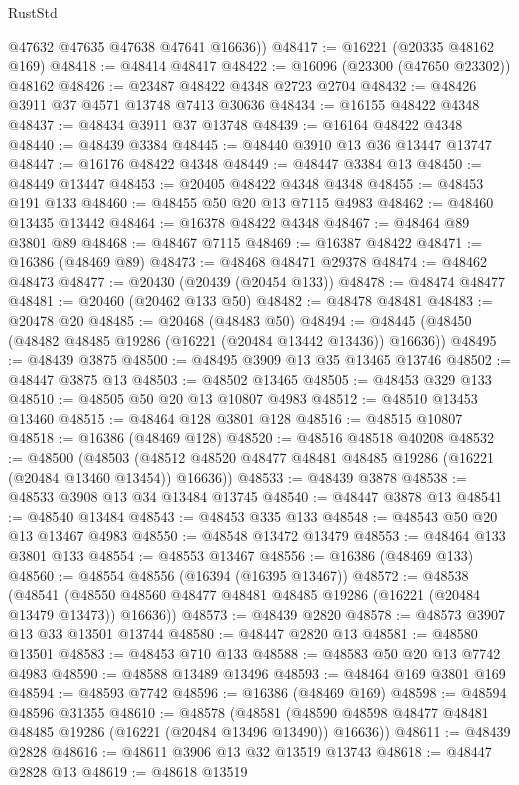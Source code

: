 \begin{lexlean}{RustStd}
\begin{coremodule}
        @47632
        @47635
        @47638
        @47641
        @16636))
@48417 := @16221 (@20335 @48162 @169)
@48418 := @48414 @48417
@48422 := @16096 (@23300 (@47650 @23302)) @48162
@48426 := @23487 @48422 @4348 @2723 @2704
@48432 := @48426 @3911 @37 @4571 @13748 @7413 @30636
@48434 := @16155 @48422 @4348
@48437 := @48434 @3911 @37 @13748
@48439 := @16164 @48422 @4348
@48440 := @48439 @3384
@48445 := @48440 @3910 @13 @36 @13447 @13747
@48447 := @16176 @48422 @4348
@48449 := @48447 @3384 @13
@48450 := @48449 @13447
@48453 := @20405 @48422 @4348 @4348
@48455 := @48453 @191 @133
@48460 := @48455 @50 @20 @13 @7115 @4983
@48462 := @48460 @13435 @13442
@48464 := @16378 @48422 @4348
@48467 := @48464 @89 @3801 @89
@48468 := @48467 @7115
@48469 := @16387 @48422
@48471 := @16386 (@48469 @89)
@48473 := @48468 @48471 @29378
@48474 := @48462 @48473
@48477 := @20430 (@20439 (@20454 @133))
@48478 := @48474 @48477
@48481 := @20460 (@20462 @133 @50)
@48482 := @48478 @48481
@48483 := @20478 @20
@48485 := @20468 (@48483 @50)
@48494 := @48445 (@48450 (@48482 @48485 @19286 (@16221 (@20484 @13442 @13436)) @16636))
@48495 := @48439 @3875
@48500 := @48495 @3909 @13 @35 @13465 @13746
@48502 := @48447 @3875 @13
@48503 := @48502 @13465
@48505 := @48453 @329 @133
@48510 := @48505 @50 @20 @13 @10807 @4983
@48512 := @48510 @13453 @13460
@48515 := @48464 @128 @3801 @128
@48516 := @48515 @10807
@48518 := @16386 (@48469 @128)
@48520 := @48516 @48518 @40208
@48532 := @48500
    (@48503 (@48512 @48520 @48477 @48481 @48485 @19286 (@16221 (@20484 @13460 @13454)) @16636))
@48533 := @48439 @3878
@48538 := @48533 @3908 @13 @34 @13484 @13745
@48540 := @48447 @3878 @13
@48541 := @48540 @13484
@48543 := @48453 @335 @133
@48548 := @48543 @50 @20 @13 @13467 @4983
@48550 := @48548 @13472 @13479
@48553 := @48464 @133 @3801 @133
@48554 := @48553 @13467
@48556 := @16386 (@48469 @133)
@48560 := @48554 @48556 (@16394 (@16395 @13467))
@48572 := @48538
    (@48541 (@48550 @48560 @48477 @48481 @48485 @19286 (@16221 (@20484 @13479 @13473)) @16636))
@48573 := @48439 @2820
@48578 := @48573 @3907 @13 @33 @13501 @13744
@48580 := @48447 @2820 @13
@48581 := @48580 @13501
@48583 := @48453 @710 @133
@48588 := @48583 @50 @20 @13 @7742 @4983
@48590 := @48588 @13489 @13496
@48593 := @48464 @169 @3801 @169
@48594 := @48593 @7742
@48596 := @16386 (@48469 @169)
@48598 := @48594 @48596 @31355
@48610 := @48578
    (@48581 (@48590 @48598 @48477 @48481 @48485 @19286 (@16221 (@20484 @13496 @13490)) @16636))
@48611 := @48439 @2828
@48616 := @48611 @3906 @13 @32 @13519 @13743
@48618 := @48447 @2828 @13
@48619 := @48618 @13519

\end{coremodule}
\end{lexlean}
